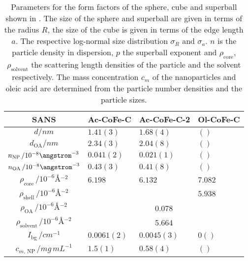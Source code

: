 \documentclass[\main/dresen_thesis.tex]{subfiles}
\begin{document}
      \begin{table}[ht]
        \centering
        \caption{\label{tab:monolayers:nanoparticle:sans:superballOAFit}Parameters for the form factors of the sphere, cube and superball shown in .
        The size of the sphere and superball are given in terms of the radius $R$, the size of the cube is given in terms of the edge length $a$.
        The respective log-normal size distribution $\sigma_R$ and $\sigma_a$. $n$ is the particle density in dispersion, $p$ the superball exponent and $\rho_\mathrm{core}$, $\rho_\mathrm{solvent}$ the scattering length densities of the particle and the solvent respectively. The mass concentration $c_m$ of the nanoparticles and oleic acid are determined from the particle number densities and the particle sizes.}
        \begin{tabular}{ c | l | l | l }
          \textbf{SANS}  & \textbf{Ac-CoFe-C} & \textbf{Ac-CoFe-C-2} & \textbf{Ol-CoFe-C}\\
          \hline
          \rule{0pt}{2ex} $d / \unit{nm}$                             & $1.41(3)$      & $1.68(4)$  & $()$ \\
          \rule{0pt}{2ex} $d_\mathrm{OA} / \unit{nm}$                 & $2.34(3)$      & $2.04(8)$  & $()$ \\
          \rule{0pt}{2ex} $n_\mathrm{NP} \, / 10^{-8} \angstrom^{-3}$ & $0.041(2)$     & $0.021(1)$ & $()$ \\
          \rule{0pt}{2ex} $n_\mathrm{OA} \, / 10^{-8} \angstrom^{-3}$ & $0.43(3)$      & $0.41(8)$  & $()$ \\
          \hline
          \rule{0pt}{2ex} $\rho_\mathrm{core}    \, / \unit{10^{-6} \angstrom^{-2}}$   & $6.198$    & $6.132$ & $7.082$\\
          \rule{0pt}{2ex} $\rho_\mathrm{shell}   \, / \unit{10^{-6} \angstrom^{-2}}$   &            &         & $5.938$\\
          \hline
          \rule{0pt}{2ex} $\rho_\mathrm{OA}      \, / \unit{10^{-6} \angstrom^{-2}}$   & \multicolumn{3}{c}{0.078}\\
          \rule{0pt}{2ex} $\rho_\mathrm{solvent} \, / \unit{10^{-6} \angstrom^{-2}}$   & \multicolumn{3}{c}{5.664}\\
          \hline
          \rule{0pt}{2ex} $I_\mathrm{bg} \, / \unit{cm^{-1}}$         & $0.0061(2)$     & $0.0045(3)$        & $0()$\\
          \hline
          \rule{0pt}{2ex} $c_{m, \, \mathrm{NP}} \, / \unit{mg\, mL^{-1}}$ & $1.5(1)$  & $0.58(4)$       & $()$\\

\end{tabular}
\end{table}
\end{document}
